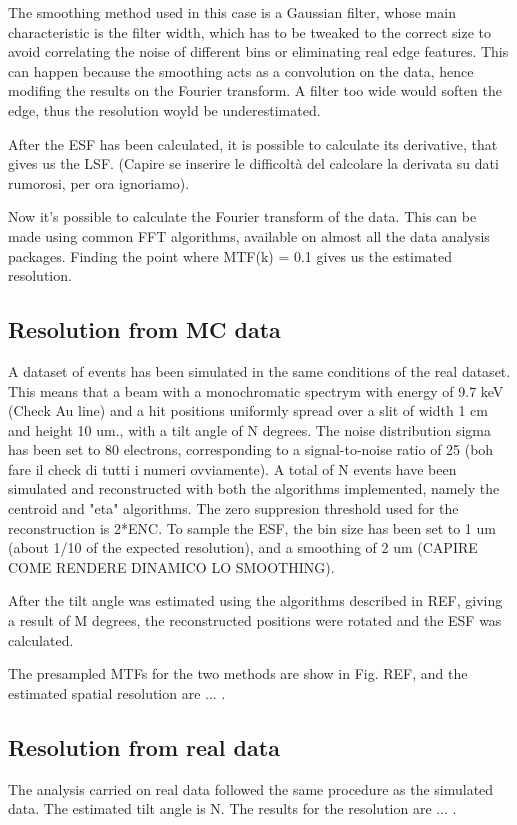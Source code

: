 The smoothing method used in this case is a Gaussian filter, whose main characteristic is the filter width, which has to be tweaked to the correct size to avoid correlating the noise of different bins or eliminating real edge features. This can happen because the smoothing acts as a convolution on the data, hence modifing the results on the Fourier transform. A filter too wide would soften the edge, thus the resolution woyld be underestimated.

After the ESF has been calculated, it is possible to calculate its derivative, that gives us the LSF. (Capire se inserire le difficoltà del calcolare la derivata su dati rumorosi, per ora ignoriamo).

Now it's possible to calculate the Fourier transform of the data. This can be made using common FFT algorithms, available on almost all the data analysis packages. Finding the point where MTF(k) = 0.1 gives us the estimated resolution.

\subsection{Resolution from MC data}

A dataset of events has been simulated in the same conditions of the real dataset. This means that a beam with a monochromatic spectrym with energy of 9.7 keV (Check Au line) and a hit positions uniformly spread over a slit of width 1 cm and height 10 um., with a tilt angle of N degrees. The noise distribution sigma has been set to 80 electrons, corresponding to a signal-to-noise ratio of 25 (boh fare il check di tutti i numeri ovviamente).
A total of N events have been simulated and reconstructed with both the algorithms implemented, namely the centroid and "eta" algorithms. The zero suppresion threshold used for the reconstruction is 2*ENC. To sample the ESF, the bin size has been set to 1 um (about 1/10 of the expected resolution), and a smoothing of 2 um (CAPIRE COME RENDERE DINAMICO LO SMOOTHING).

After the tilt angle was estimated using the algorithms described in REF, giving a result of M degrees, the reconstructed positions were rotated and the ESF was calculated.

The presampled MTFs for the two methods are show in Fig. REF, and the estimated spatial resolution are ... .

\subsection{Resolution from real data}

The analysis carried on real data followed the same procedure as the simulated data. The estimated tilt angle is N. The results for the resolution are ... .




 







 

